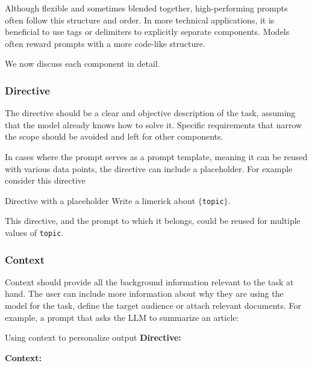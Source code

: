 Although flexible and sometimes blended together, high-performing prompts \\often follow this structure and order. 
In more technical applications, it is beneficial to use tags or delimiters to explicitly separate components.
Models often reward prompts with a more code-like structure\cite{10.1145/3544548.3581388}. 

We now discuss each component in detail.

\subsubsection{Directive}
The directive should be a clear and objective description of the task, assuming that the model
already knows how to solve it\cite{reynolds2021promptprogramminglargelanguage}. 
Specific requirements that narrow the scope should be avoided and left for other components.

In cases where the prompt serves as a prompt template, meaning it can be reused with various data points,
the directive can include a placeholder. For example consider this directive
\begin{promptbox}{Directive with a placeholder}
    Write a limerick about \texttt{$\{$topic$\}$}.
\end{promptbox}
This directive, and the prompt to which it belongs, could be reused for multiple values of \texttt{topic}.

\subsubsection{Context}
Context should provide all the background information relevant to the task at hand.
The user can include more information about why they are using the model for the task,
define the target audience or attach relevant documents. For example, a prompt that asks the LLM to summarize an article:

\begin{promptbox}[label={box:contextprompt}]{Using context to personalize output}
    \textbf{Directive:}
    
    
    \textbf{Context:}
    
\end{promptbox}


